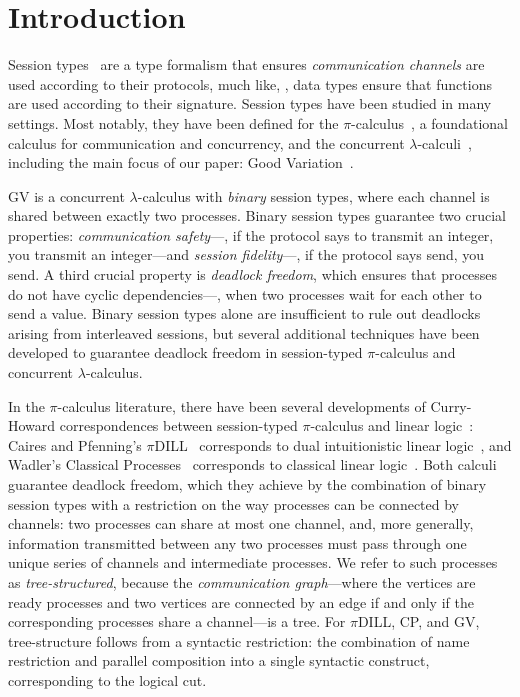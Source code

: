 \section{Introduction}
Session types~\cite{honda93,takeuchihonda94,hondavasconcelos98} are a type formalism that ensures \emph{communication channels} are used according to their protocols, much like, \eg, data types ensure that functions are used according to their signature. Session types have been studied in many settings. Most notably, they have been defined for the $\pi$-calculus~\cite{honda93,takeuchihonda94,hondavasconcelos98}, a foundational calculus for communication and concurrency, and the concurrent $\lambda$-calculi~\cite{gayvasconcelos10}, including the main focus of our paper: Good Variation~\cite[GV]{wadler15,lindleymorris15}.

GV is a concurrent $\lambda$-calculus with \emph{binary} session types, where each channel is shared between exactly two processes. Binary session types guarantee two crucial properties: \emph{communication safety}---\eg, if the protocol says to transmit an integer, you transmit an integer---and \emph{session fidelity}---\eg, if the protocol says send, you send. A third crucial property is \emph{deadlock freedom}, which ensures that processes do not have cyclic dependencies---\eg, when two processes wait for each other to send a value. Binary session types {alone} are insufficient to rule out deadlocks arising from interleaved sessions, but several additional techniques have been developed to guarantee deadlock freedom in session-typed $\pi$-calculus and concurrent $\lambda$-calculus.

In the $\pi$-calculus literature, there have been several developments of Curry-Howard correspondences between session-typed $\pi$-calculus and linear logic~\cite{girard87}: Caires and Pfenning's $\pi$DILL~\cite{cairespfenning10} corresponds to dual intuitionistic linear logic~\cite{barber96}, and Wadler's Classical Processes~\cite[CP]{wadler14} corresponds to classical linear logic~\cite[CLL]{girard87}. Both calculi guarantee deadlock freedom, which they achieve by the combination of binary session types with a restriction on the way processes can be connected by channels: two processes can share at most one channel, and, more generally, information transmitted between any two processes must pass through one unique series of channels and intermediate processes. We refer to such processes as \emph{tree-structured}, because the \emph{communication graph}---where the vertices are ready processes and two vertices are connected by an edge if and only if the corresponding processes share a channel---is a tree. For $\pi$DILL, CP, and GV, tree-structure follows from a syntactic restriction: the combination of name restriction and parallel composition into a single syntactic construct, corresponding to the logical cut.

